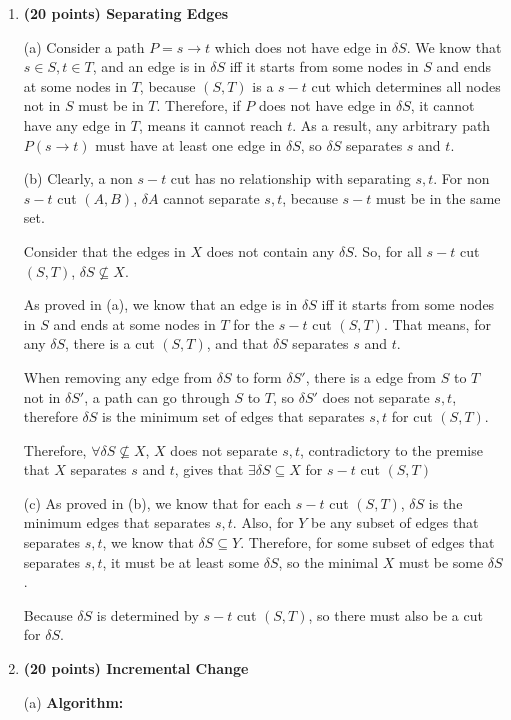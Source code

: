 \documentclass{article}
\newcommand{\algorithm}{\textbf{Algorithm:} }
\begin{document}
\begin{enumerate}[topsep=0pt]
\item \textbf{(20 points) Separating Edges} 

(a) Consider a path $P=s\rightarrow t$ which does not have edge in $\delta S$.
We know that $s\in S,t\in T$, and an edge is in $\delta S$ iff it starts from some nodes in $S$ and ends at some nodes in $T$, 
because $(S,T)$ is a $s-t$ cut which determines all nodes not in $S$ must be in $T$.
Therefore, if $P$ does not have edge in $\delta S$, it cannot have any edge in $T$, means it cannot reach $t$.
As a result, any arbitrary path $P(s\rightarrow t)$ must have at least one edge in $\delta S$, so $\delta S$ separates $s$ and $t$.

(b) Clearly, a non $s-t$ cut has no relationship with separating $s,t$. 
For non $s-t$ cut $(A,B)$, $\delta A$ cannot separate $s,t$, because $s-t$ must be in the same set.

Consider that the edges in $X$ does not contain any $\delta S$.
So, for all $s-t$ cut $(S,T)$, $\delta S\not\subseteq X$.

As proved in (a), we know that an edge is in $\delta S$ iff it starts from some nodes in $S$ and ends at some nodes in $T$ for the $s-t$ cut $(S,T)$.
That means, for any $\delta S$, there is a cut $(S,T)$, and that $\delta S$ separates $s$ and $t$.

When removing any edge from $\delta S$ to form $\delta S'$, there is a edge from $S$ to $T$ not in $\delta S'$, a path can go through $S$ to $T$, 
so $\delta S'$ does not separate $s,t$, therefore $\delta S$ is the minimum set of edges that separates $s,t$ for cut $(S,T)$.

Therefore, $\forall\delta S\not\subseteq X$, $X$ does not separate $s,t$, 
contradictory to the premise that $X$ separates $s$ and $t$,
gives that $\exists\delta S \subseteq X$ for $s-t$ cut $(S,T)$

(c) As proved in (b), we know that for each $s-t$ cut $(S,T)$, $\delta S$ is the minimum edges that separates $s,t$.
Also, for $Y$ be any subset of edges that separates $s,t$, we know that $\delta S \subseteq Y$.
Therefore, for some subset of edges that separates $s,t$, it must be at least some $\delta S$,
so the minimal $X$ must be some $\delta S$.

Because $\delta S$ is determined by $s-t$ cut $(S,T)$, so there must also be a cut for $\delta S$.
 
\item \textbf{(20 points) Incremental Change} 

(a) \algorithm


\end{enumerate}
\end{document}
